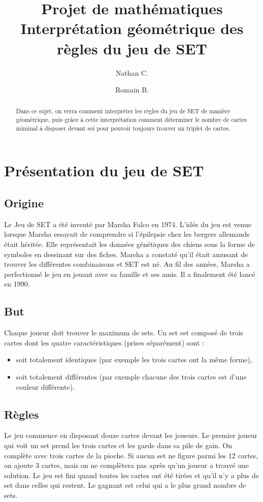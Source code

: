 \documentclass[a4paper,12pt,titlepage]{article}
\title{Projet de mathématiques \\
		\large Interprétation géométrique des règles du jeu de SET}
\author{Nathan C. \and Romain B.}
\theoremstyle{plain}
\theoremstyle{definition}
\begin{document}
\maketitle
\tableofcontents
\newpage

\begin{abstract}
Dans ce sujet, on verra comment interpréter les règles du jeu de SET de manière géométrique, 
puis grâce à cette interprétation comment déterminer le nombre de cartes minimal à disposer devant soi pour pouvoir toujours trouver un triplet de cartes.
\end{abstract}

\section{Présentation du jeu de SET}
\subsection{Origine}
Le Jeu de SET a été inventé par Marsha Falco en 1974. L'idée du jeu est venue lorsque Marsha essayait de comprendre si l'épilepsie chez les bergers allemands était héritée. 
Elle représentait les données génétiques des chiens sous la forme de symboles en dessinant sur des fiches. 
Marsha a constaté qu'il était amusant de trouver les différentes combinaisons et SET est né. Au fil des années, Marsha a perfectionné le jeu en jouant avec sa famille et ses amis. 
Il a finalement été lancé en 1990.

\subsection{But}
Chaque joueur doit trouver le maximum de sets. Un set est composé de trois cartes dont les quatre caractéristiques (prises séparément) sont : 
\begin{itemize}
\item soit totalement identiques (par exemple les trois cartes ont la même forme),
\item soit totalement différentes (par exemple chacune des trois cartes est d'une couleur différente).
\end{itemize}

\subsection{Règles}
Le jeu commence en disposant douze cartes devant les joueurs.
Le premier joueur qui voit un set prend les trois cartes et les garde dans sa pile de gain. 
On complète avec trois cartes de la pioche. Si aucun set ne figure parmi les 12 cartes, on ajoute 3 cartes, mais on ne complètera pas après qu'un joueur a trouvé une solution.
Le jeu est fini quand toutes les cartes ont été tirées et qu'il n'y a plus de set dans celles qui restent.
Le gagnant est celui qui a le plus grand nombre de sets. 
\end{document}
